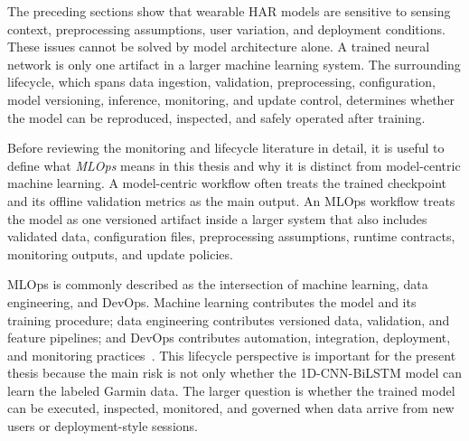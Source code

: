 The preceding sections show that wearable HAR models are sensitive to sensing context, preprocessing assumptions, user variation, and deployment conditions. These issues cannot be solved by model architecture alone. A trained neural network is only one artifact in a larger machine learning system. The surrounding lifecycle, which spans data ingestion, validation, preprocessing, configuration, model versioning, inference, monitoring, and update control, determines whether the model can be reproduced, inspected, and safely operated after training.

Before reviewing the monitoring and lifecycle literature in detail, it is useful to define what \emph{MLOps} means in this thesis and why it is distinct from model-centric machine learning. A model-centric workflow often treats the trained checkpoint and its offline validation metrics as the main output. An MLOps workflow treats the model as one versioned artifact inside a larger system that also includes validated data, configuration files, preprocessing assumptions, runtime contracts, monitoring outputs, and update policies.

MLOps is commonly described as the intersection of machine learning, data engineering, and DevOps. Machine learning contributes the model and its training procedure; data engineering contributes versioned data, validation, and feature pipelines; and DevOps contributes automation, integration, deployment, and monitoring practices~\cite{hewage2022mlops,kreuzberger2023mlops}. This lifecycle perspective is important for the present thesis because the main risk is not only whether the 1D-CNN-BiLSTM model can learn the labeled Garmin data. The larger question is whether the trained model can be executed, inspected, monitored, and governed when data arrive from new users or deployment-style sessions.

